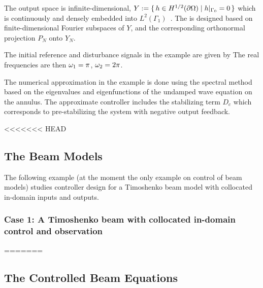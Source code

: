 \documentclass[11pt, a4paper]{amsart}
\theoremstyle{definition}
\numberwithin{equation}{section}
\begin{document}
{  The output space is infinite-dimensional,  $Y :=  \{\,h\in H^{1/2}(\partial\Omega)\mid h\vert_{\Gamma_0}=0\,\}$ which is continuously and densely embedded into $L^2(\Gamma_1)$~. 
  The  is designed based on finite-dimensional Fourier subspaces
  of $Y$, and the corresponding orthonormal projection $P_N$ onto $Y_N$.

  The initial reference and disturbance signals in the example are given by
  The real frequencies are then $\omega_1=\pi$, $ \omega_2=2\pi$.

  The numerical approximation in the example is done using the spectral method based on the eigenvalues and eigenfunctions of the undamped wave equation on the annulus. The approximate controller includes the stabilizing term $D_c$ which corresponds to pre-stabilizing the system with negative output feedback. 
}

<<<<<<< HEAD
\subsection{The Beam Models}

The following example (at the moment the only example on control of beam models) studies controller design for a Timoshenko beam model with collocated in-domain inputs and outputs.

\subsubsection*{Case 1: A Timoshenko beam with collocated in-domain control and observation}
=======
\subsection{The Controlled Beam Equations}
\end{document}
